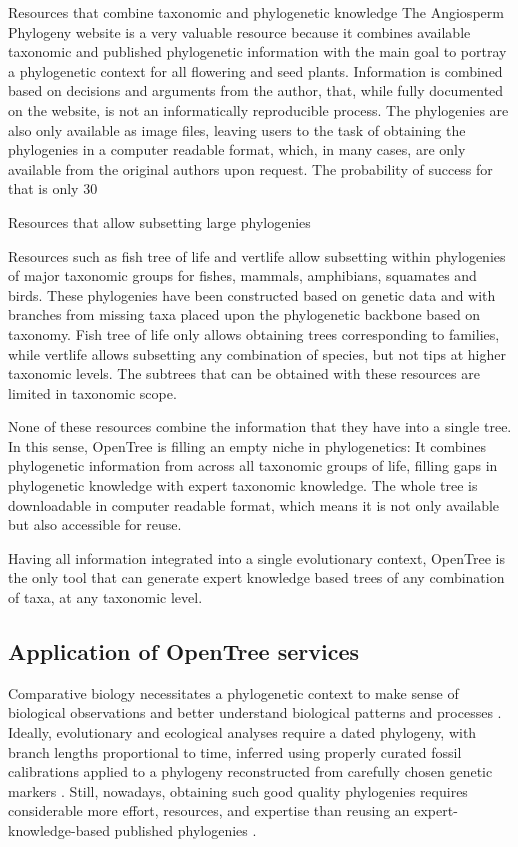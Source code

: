 \documentclass[oupdraft]{sysbio_sse}
\begin{document}
Resources that combine taxonomic and phylogenetic knowledge
The Angiosperm Phylogeny website is a very valuable resource because it combines available taxonomic and published phylogenetic information with the main goal to portray a phylogenetic context for all flowering and seed plants. Information is combined based on decisions and arguments from the author, that, while fully documented on the website, is not an informatically reproducible process. The phylogenies are also only available as image files, leaving users to the task of obtaining the phylogenies in a computer readable format, which, in many cases, are only available from the original authors upon request. The probability of success for that is only 30%

Resources that allow subsetting large phylogenies

Resources such as fish tree of life and vertlife allow subsetting within phylogenies of major taxonomic groups for fishes, mammals, amphibians, squamates and birds. These phylogenies have been constructed based on genetic data and with branches from missing taxa placed upon the phylogenetic backbone based on taxonomy. Fish tree of life only allows obtaining trees corresponding to families, while vertlife allows subsetting any combination of species, but not tips at higher taxonomic levels. The subtrees that can be obtained with these resources are limited in taxonomic scope.

None of these resources combine the information that they have into a single tree.
In this sense, OpenTree is filling an empty niche in phylogenetics:
It combines phylogenetic information from across all taxonomic groups of life, filling gaps in phylogenetic knowledge with expert taxonomic knowledge. The whole tree is downloadable in computer readable format, which means it is not only available but also accessible for reuse.

Having all information integrated into a single evolutionary context, OpenTree is the only tool that can generate expert knowledge based trees of any combination of taxa, at any taxonomic level.


\subsection{Application of OpenTree services}

Comparative biology necessitates a phylogenetic context to make sense of biological
observations and better understand biological patterns and processes
\citep{felsenstein1985phylogenies, soltis2003role}.
Ideally, evolutionary and ecological analyses require a dated phylogeny, with branch lengths
proportional to time, inferred using properly curated fossil calibrations applied
to a phylogeny reconstructed from carefully chosen genetic markers \citep{webb2008phylocom, jantzen2019effects}.
Still, nowadays, obtaining such good quality phylogenies requires
considerable more effort, resources, and expertise than reusing an expert-knowledge-based
published phylogenies \citep{li2019common}.
\end{document}
